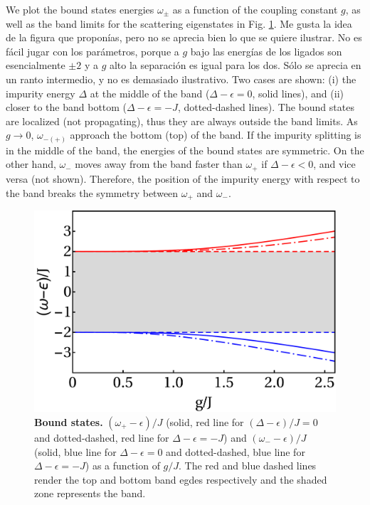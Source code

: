 \documentclass[aps,pra,twocolumn,floatfix,superscriptaddress]{revtex4-1}%
\begin{document}
We plot the bound states energies $\omega_\pm$ as a function of the coupling constant $g$, as well as the band limits for the scattering eigenstates in Fig. \ref{fig:E_bound}. {\color{red}Me gusta la idea de la figura que propon\'ias, pero no se aprecia bien lo que se quiere ilustrar. No es f\'acil jugar con los par\'ametros, porque a $g$ bajo las energ\'ias de los ligados son esencialmente $\pm 2$ y a $g$ alto la separaci\'on es igual para los dos. S\'olo se aprecia en un ranto intermedio, y no es demasiado ilustrativo.}
Two cases are shown: (i) the impurity energy $\Delta$ at the middle of the band ($\Delta-\epsilon=0$, solid lines), and (ii) closer to the band bottom  ($\Delta-\epsilon=-J$, dotted-dashed lines). 
The bound states are localized (not propagating), thus they are always outside the band limits.
As $g\to 0$, $\omega_{-(+)}$   approach the bottom (top) of the band.
If  the impurity splitting  is in the middle of the band, the energies of the bound states are  symmetric.
On the other hand, $\omega_-$ moves away from the band faster than $\omega_+$ if $\Delta-\epsilon<0$, and vice versa (not shown). Therefore, the position of the impurity energy with respect to the band breaks the symmetry between $\omega_+$ and $\omega_-$.

\begin{figure}[thb!]
\includegraphics[width=1\columnwidth]{E_bound_all.pdf}
\caption{{\bf Bound states.} $(\omega_+-\epsilon)/J$ (solid, red line for $(\Delta-\epsilon)/J=0$ and dotted-dashed, red line for $\Delta-\epsilon=-J$) and $(\omega_--\epsilon)/J$ (solid, blue line for $\Delta-\epsilon=0$ and dotted-dashed, blue line for $\Delta-\epsilon=-J$) as a function of $g/J$. The red and blue dashed lines render the top and bottom band egdes respectively and the shaded zone represents the band.}\label{fig:E_bound}
\end{figure}
 
\end{document}
